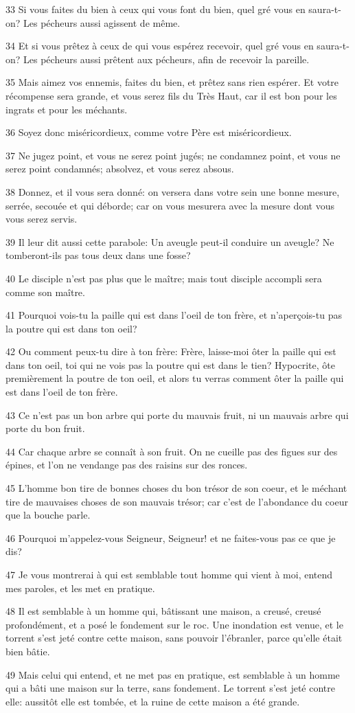 \par 33 Si vous faites du bien à ceux qui vous font du bien, quel gré vous en saura-t-on? Les pécheurs aussi agissent de même.
\par 34 Et si vous prêtez à ceux de qui vous espérez recevoir, quel gré vous en saura-t-on? Les pécheurs aussi prêtent aux pécheurs, afin de recevoir la pareille.
\par 35 Mais aimez vos ennemis, faites du bien, et prêtez sans rien espérer. Et votre récompense sera grande, et vous serez fils du Très Haut, car il est bon pour les ingrats et pour les méchants.
\par 36 Soyez donc miséricordieux, comme votre Père est miséricordieux.
\par 37 Ne jugez point, et vous ne serez point jugés; ne condamnez point, et vous ne serez point condamnés; absolvez, et vous serez absous.
\par 38 Donnez, et il vous sera donné: on versera dans votre sein une bonne mesure, serrée, secouée et qui déborde; car on vous mesurera avec la mesure dont vous vous serez servis.
\par 39 Il leur dit aussi cette parabole: Un aveugle peut-il conduire un aveugle? Ne tomberont-ils pas tous deux dans une fosse?
\par 40 Le disciple n'est pas plus que le maître; mais tout disciple accompli sera comme son maître.
\par 41 Pourquoi vois-tu la paille qui est dans l'oeil de ton frère, et n'aperçois-tu pas la poutre qui est dans ton oeil?
\par 42 Ou comment peux-tu dire à ton frère: Frère, laisse-moi ôter la paille qui est dans ton oeil, toi qui ne vois pas la poutre qui est dans le tien? Hypocrite, ôte premièrement la poutre de ton oeil, et alors tu verras comment ôter la paille qui est dans l'oeil de ton frère.
\par 43 Ce n'est pas un bon arbre qui porte du mauvais fruit, ni un mauvais arbre qui porte du bon fruit.
\par 44 Car chaque arbre se connaît à son fruit. On ne cueille pas des figues sur des épines, et l'on ne vendange pas des raisins sur des ronces.
\par 45 L'homme bon tire de bonnes choses du bon trésor de son coeur, et le méchant tire de mauvaises choses de son mauvais trésor; car c'est de l'abondance du coeur que la bouche parle.
\par 46 Pourquoi m'appelez-vous Seigneur, Seigneur! et ne faites-vous pas ce que je dis?
\par 47 Je vous montrerai à qui est semblable tout homme qui vient à moi, entend mes paroles, et les met en pratique.
\par 48 Il est semblable à un homme qui, bâtissant une maison, a creusé, creusé profondément, et a posé le fondement sur le roc. Une inondation est venue, et le torrent s'est jeté contre cette maison, sans pouvoir l'ébranler, parce qu'elle était bien bâtie.
\par 49 Mais celui qui entend, et ne met pas en pratique, est semblable à un homme qui a bâti une maison sur la terre, sans fondement. Le torrent s'est jeté contre elle: aussitôt elle est tombée, et la ruine de cette maison a été grande.

